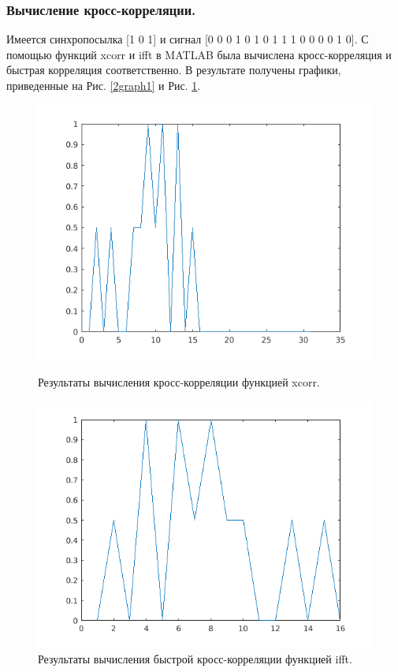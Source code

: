 \documentclass[a4paper,14pt]{extarticle}
\begin{document}
\subsubsection{Вычисление кросс-корреляции.}
Имеется синхропосылка [1 0 1] и сигнал [0 0 0 1 0 1 0 1 1 1 0 0 0 0 1 0]. С помощью функций xcorr и ifft в MATLAB была вычислена кросс-корреляция и быстрая корреляция соответственно. В результате получены графики, приведенные на Рис. \ref{2graph1} и Рис. \ref{2graph2}.
\begin{figure}[H]
\centering
\includegraphics[scale=0.7]{pics/2corr.png}
\caption{Результаты вычисления кросс-корреляции функцией xcorr.}
\label{2graph1}
\centering
\includegraphics[scale=0.7]{pics/2corr2.png}
\caption{Результаты вычисления быстрой кросс-корреляции функцией ifft.}
\label{2graph2}
\end{figure}
\end{document}
